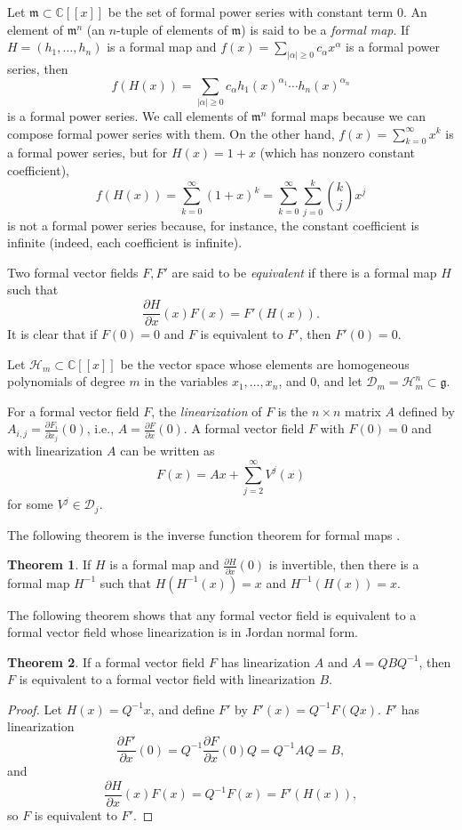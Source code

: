\documentclass{article}
\theoremstyle{definition}
\newtheorem{theorem}{Theorem}
\begin{document}
Let $\mathfrak{m} \subset \mathbb{C}[[x]]$ be the set of formal power series with constant term $0$. 
An element of $\mathfrak{m}^n$ (an $n$-tuple of elements of $\mathfrak{m}$) is said to be a {\em formal map}. If $H=(h_1,\ldots,h_n)$ is a formal map and $f(x)=\sum_{|\alpha| \geq 0} c_\alpha x^\alpha$ is a formal power series, then
\[
f(H(x))=\sum_{|\alpha| \geq 0} c_\alpha h_1(x)^{\alpha_1} \cdots h_n(x)^{\alpha_n}
\] 
is a formal power series. We call elements of $\mathfrak{m}^n$ formal maps because we can compose
formal power series with them. On the other hand, $f(x)=\sum_{k=0}^\infty x^k$ is a formal power series, but 
for $H(x)=1+x$ (which has nonzero constant coefficient),
\[
f(H(x))=\sum_{k=0}^\infty (1+x)^k= \sum_{k=0}^\infty \sum_{j=0}^k \binom{k}{j} x^j
\]
is not a formal power series because, for instance, the constant coefficient is infinite (indeed, each coefficient is infinite).

Two formal vector fields $F,F'$ are said to be {\em equivalent} if there is a
formal map $H$ such that 
\[
\frac{\partial H}{\partial x}(x)F(x)=F'(H(x)).
\]
It is clear that if $F(0)=0$ and $F$ is equivalent to $F'$, then $F'(0)=0$.

Let $\mathscr{H}_m \subset \mathbb{C}[[x]]$ be the vector space whose elements are homogeneous polynomials of degree $m$ 
in the variables $x_1,\ldots,x_n$, and $0$, and let $\mathscr{D}_m=
\mathscr{H}_m^n \subset \mathfrak{g}$.

For a formal vector field $F$, the {\em linearization} of $F$ is the $n \times n$ matrix $A$ defined by $A_{i,j}=\frac{\partial F_i}{\partial x_j}(0)$, i.e., $A=\frac{\partial F}{\partial x}(0)$. A formal vector field
$F$ with $F(0)=0$ and with linearization $A$ can be written as 
\[
F(x)=Ax+\sum_{j=2}^\infty V^j(x)
\]
for some $V^j \in \mathscr{D}_j$.

The following theorem is the inverse function theorem for formal maps \cite[pp. 32--33]{analytic}.

\begin{theorem}
If $H$ is a formal map and $\frac{\partial H}{\partial x}(0)$ is invertible, then there is a formal map $H^{-1}$ such that $H(H^{-1}(x))=x$ and $H^{-1}(H(x))=x$.
\end{theorem}

The following theorem shows that any formal vector field is equivalent to a formal vector field whose linearization is in Jordan normal form.

\begin{theorem}
\label{jordanform}
If a formal vector field $F$ has linearization $A$ and $A=QBQ^{-1}$, then
$F$ is equivalent to a formal vector field with linearization $B$.
\end{theorem}
\begin{proof}
Let $H(x)=Q^{-1}x$, and
define $F'$ by $F'(x)=Q^{-1} F(Qx)$. $F'$ has linearization
\[
\frac{\partial F'}{\partial x}(0)=Q^{-1}\frac{\partial F}{\partial x}(0) Q=Q^{-1}AQ=B,
\]
and
\[
\frac{\partial H}{\partial x}(x)F(x)=Q^{-1}F(x)=F'(H(x)),
\]
so $F$ is equivalent to $F'$.
\end{proof}
\end{document}
